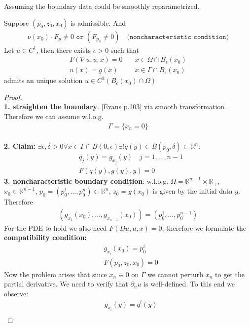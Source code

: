 Assuming the boundary data could be smoothly reparametrized. 
\begin{theorem}
	Suppose $(p_0, z_0, x_0)$ is admissible. And
	\begin{align*}
		\nu(x_0) \cdot F_p \neq 0 \texttt{ or }(F_{p_n} \neq 0) \quad (\texttt{noncharacteristic condition)}
	\end{align*}
	Let $u \in C^1$, then there exists $\epsilon > 0$ such that 
	\begin{align*}
		F(\nabla u, u, x) = 0 \quad &x \in \Omega \cap B_\epsilon(x_0)\\
		u(x) = g(x) \quad &x \in \Gamma \cap B_\epsilon (x_0)
	\end{align*} 
	admits an unique solution $u \in C^2(B_\epsilon(x_0) \cap \Omega)$
\end{theorem}
\begin{proof}\quad\\
\textbf{1. straighten the boundary}.	[Evans p.103] via smooth transformation. Therefore we can assume w.l.o.g.
\begin{align*}
	\Gamma= \{x_n = 0\}
\end{align*} \\
\textbf{2. Claim:} $\exists \epsilon, \delta > 0 \forall x \in \Gamma \cap B(0, \epsilon) \exists ! q(y) \in B(p_0, \delta) \subset \mathbb{R}^n$:
\begin{align*}
	&q_j(y) = g_{x_j}(y)  \quad j = 1, \dots, n-1\\
	&F(q(y), g(y), y) = 0
\end{align*}
\textbf{3. noncharacteristic boundary condition}:
w.l.o.g. $\Omega = \mathbb{R}^{n - 1} \times \mathbb{R}_+$, $x_0 \in \mathbb{R}^{n-1}$,  $p_0 = (p_0^1, \dots, p_0^n) \subset \mathbb{R}^n$, $z_0 = g(x_0)$ is given by the initial data $g$. Therefore 
\begin{align*}
	(g_{x_1}(x_0), \dots, g_{x_{n-1}}(x_0)) = (p_0^1, \dots, p_0^{n-1})
\end{align*}
For the PDE to hold we also need $F(Du, u, x) = 0$, therefore we formulate the \textbf{compatibility condition:}
\begin{align*}
	&g_{x_i}(x_0) = p_0^i \\
	&F(p_0, z_0, x_0) = 0
\end{align*}
Now the problem arises that since $x_n \equiv 0$ on $\Gamma$ we cannot perturb $x_n$ to get the partial derivative. We need to verify that $\partial_n u$ is well-defined. To this end we observe:
\begin{align*}
	&g_{x_i}(y) = q^i(y)\\

\end{align*}
\end{proof}
